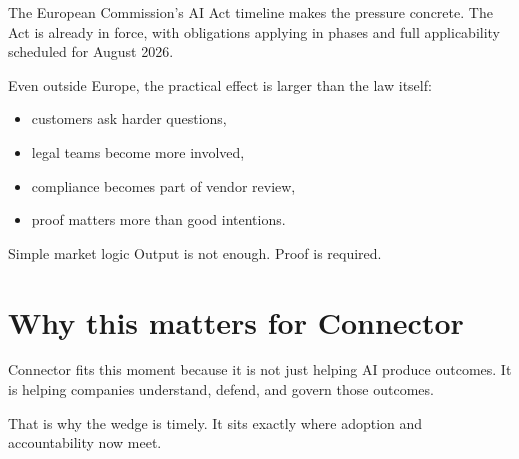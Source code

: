 The European Commission's AI Act timeline makes the pressure concrete.
The Act is already in force, with obligations applying in phases and full applicability scheduled for August 2026.

Even outside Europe, the practical effect is larger than the law itself:

\begin{itemize}
  \item customers ask harder questions,
  \item legal teams become more involved,
  \item compliance becomes part of vendor review,
  \item proof matters more than good intentions.
\end{itemize}

\begin{conceptbox}{Simple market logic}
Output is not enough.
Proof is required.
\end{conceptbox}

\section{Why this matters for Connector}

Connector fits this moment because it is not just helping AI produce outcomes.
It is helping companies understand, defend, and govern those outcomes.

That is why the wedge is timely.
It sits exactly where adoption and accountability now meet.
